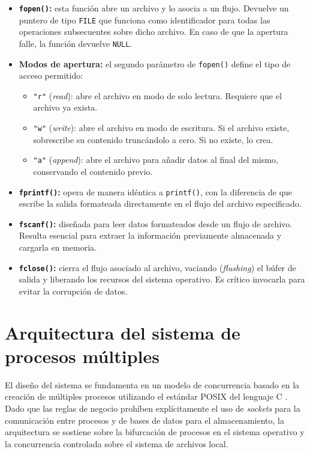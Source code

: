 \begin{itemize}[leftmargin=*]
    \item \textbf{\texttt{fopen()}:} esta función abre un archivo y lo asocia a un flujo. Devuelve un puntero de tipo \texttt{FILE} que funciona como identificador para todas las operaciones subsecuentes sobre dicho archivo. En caso de que la apertura falle, la función devuelve \texttt{NULL}.
    \item \textbf{Modos de apertura:} el segundo parámetro de \texttt{fopen()} define el tipo de acceso permitido:
    \begin{itemize}
        \item \texttt{"r"} (\textit{read}): abre el archivo en modo de solo lectura. Requiere que el archivo ya exista.
        \item \texttt{"w"} (\textit{write}): abre el archivo en modo de escritura. Si el archivo existe, sobrescribe su contenido truncándolo a cero. Si no existe, lo crea.
        \item \texttt{"a"} (\textit{append}): abre el archivo para añadir datos al final del mismo, conservando el contenido previo.
    \end{itemize}
    \item \textbf{\texttt{fprintf()}:} opera de manera idéntica a \texttt{printf()}, con la diferencia de que escribe la salida formateada directamente en el flujo del archivo especificado.
    \item \textbf{\texttt{fscanf()}:} diseñada para leer datos formateados desde un flujo de archivo. Resulta esencial para extraer la información previamente almacenada y cargarla en memoria.
    \item \textbf{\texttt{fclose()}:} cierra el flujo asociado al archivo, vaciando (\textit{flushing}) el búfer de salida y liberando los recursos del sistema operativo. Es crítico invocarla para evitar la corrupción de datos.
\end{itemize}


\section{Arquitectura del sistema de procesos múltiples}
\label{sec:prac02:arquitectura}

El diseño del sistema se fundamenta en un modelo de concurrencia basado en la creación de múltiples procesos utilizando el estándar POSIX del lenguaje C \cite{marquez:unix-programacion:2015}. Dado que las reglas de negocio prohíben explícitamente el uso de \textit{sockets} para la comunicación entre procesos y de bases de datos para el almacenamiento, la arquitectura se sostiene sobre la bifurcación de procesos en el sistema operativo y la concurrencia controlada sobre el sistema de archivos local.

